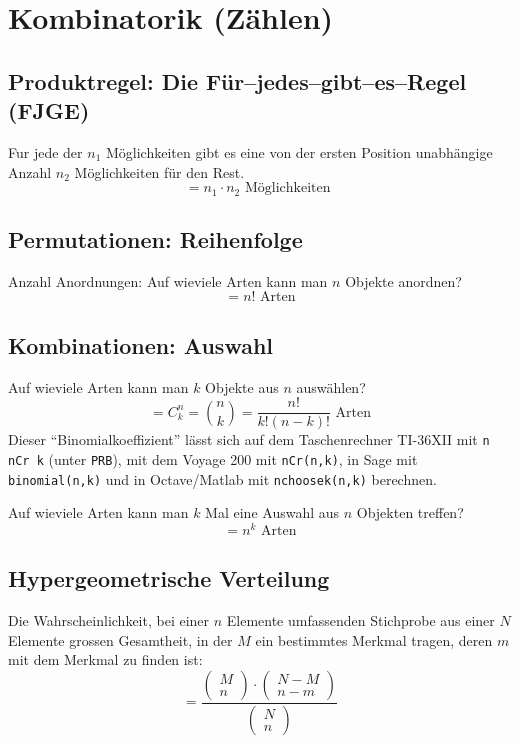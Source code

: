 \section{Kombinatorik (Zählen)}
\subsection{Produktregel: Die Für–jedes–gibt–es–Regel (FJGE)}
Fur jede der $n_1$ Möglichkeiten gibt es eine von der
ersten Position unabhängige Anzahl $n_2$ Möglichkeiten für den Rest.
\[ = n_1 \cdot n_2 \text{ Möglichkeiten } \]

\subsection{Permutationen: Reihenfolge}
Anzahl Anordnungen: Auf wieviele Arten kann man $n$ Objekte anordnen?
\[ = n! \text{ Arten} \]

\subsection{Kombinationen: Auswahl}
Auf wieviele Arten kann man $k$ Objekte aus $n$ auswählen?
\[ = C^n_k=\binom{n}{k} = \frac{n!}{k!(n-k)!} \text{ Arten} \]
Dieser "`Binomialkoeffizient"' lässt sich auf dem Taschenrechner
TI-36XII mit \texttt{n nCr k} (unter \texttt{PRB}), mit dem Voyage 200
mit \texttt{nCr(n,k)}, in Sage mit \texttt{binomial(n,k)} und in 
Octave/Matlab mit \texttt{nchoosek(n,k)} berechnen.

Auf wieviele Arten kann man $k$ Mal eine Auswahl aus $n$ Objekten
treffen?
\[ = n^k \text{ Arten} \]

\subsection{Hypergeometrische Verteilung}

Die Wahrscheinlichkeit, bei einer $n$ Elemente umfassenden Stichprobe
aus einer $N$ Elemente grossen Gesamtheit, in der $M$ ein bestimmtes
Merkmal tragen, deren $m$ mit dem Merkmal zu finden ist:
\[ = \frac{\begin{pmatrix}M\\n\end{pmatrix} \cdot
  \begin{pmatrix}N-M\\n-m\end{pmatrix}}
  {\begin{pmatrix}N\\n\end{pmatrix}} \]

